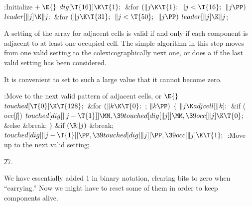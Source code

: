 \B{}:Initialize\X${}\mathrel+\E{}$\6
$\\{dig}[\T{16}]\K\T{1};{}$\6
\&{for} ${}(\|j\K\T{1};{}$ ${}\|j<\T{16};{}$ ${}\|j\PP){}$\1\5
${}\\{leader}[\|j]\K\|j;{}$\2\6
\&{for} ${}(\|j\K\T{31};{}$ ${}\|j<\T{50};{}$ ${}\|j\PP){}$\1\5
${}\\{leader}[\|j]\K\|j{}$;\2\par
\fi

A setting of the  array for adjacent cells is
valid if and only
if each component is adjacent to at least one occupied cell. The
simple algorithm in this step moves from one valid setting to the
colexicographically next one, or does a  if the last valid
setting has been considered.

It is convenient to set  to such a large value that it
cannot become zero.

\Y\B\4:Move to the next valid pattern of adjacent cells, or %
\X${}\E{}$\6
$\\{touched}[\T{0}]\K\T{128};{}$\6
\&{for} ${}(\|k\K\T{0};{}$  ; ${}\|k\PP){}$\5
${}\{{}$\1\6
${}\|j\K\\{adjcell}[\|k];{}$\6
\&{if} (\\{occ}[\|j])\1\5
${}\\{touched}[\\{dig}[\|j-\T{1}]]\MM,\39\\{touched}[\\{dig}[\|j]]\MM,\39%
\\{occ}[\|j]\K\T{0};{}$\2\6
\&{else}\1\5
\&{break};\2\6
\4${}\}{}$\2\6
\&{if} ${}(\R\|j){}$\1\5
\&{break};\2\6
${}\\{touched}[\\{dig}[\|j-\T{1}]]\PP,\39\\{touched}[\\{dig}[\|j]]\PP,\39%
\\{occ}[\|j]\K\T{1};{}$\6
:Move up to the next valid setting\X;\par
\U27.\fi

We have essentially added 1 in binary notation, clearing %
 bits
to zero when ``carrying.'' Now we might have to reset some of them
in order to keep components alive.

